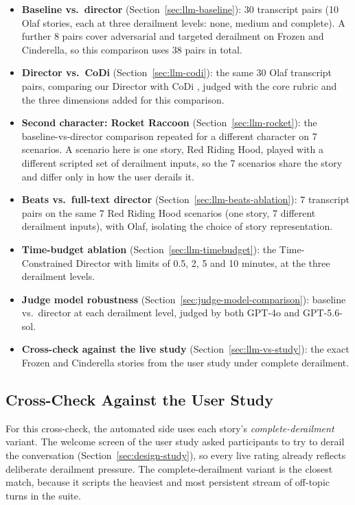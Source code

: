 \begin{itemize}
\item \textbf{Baseline vs.\ director} (Section~\ref{sec:llm-baseline}): 30 transcript pairs (10 Olaf stories, each at three derailment levels: none, medium and complete). A further 8 pairs cover adversarial and targeted derailment on Frozen and Cinderella, so this comparison uses 38 pairs in total.
\item \textbf{Director vs.\ CoDi} (Section~\ref{sec:llm-codi}): the same 30 Olaf transcript pairs, comparing our Director with CoDi \cite{kim2025codi}, judged with the core rubric and the three dimensions added for this comparison.
\item \textbf{Second character: Rocket Raccoon} (Section~\ref{sec:llm-rocket}): the baseline-vs-director comparison repeated for a different character on 7 scenarios. A scenario here is one story, Red Riding Hood, played with a different scripted set of derailment inputs, so the 7 scenarios share the story and differ only in how the user derails it.
\item \textbf{Beats vs.\ full-text director} (Section~\ref{sec:llm-beats-ablation}): 7 transcript pairs on the same 7 Red Riding Hood scenarios (one story, 7 different derailment inputs), with Olaf, isolating the choice of story representation.
\item \textbf{Time-budget ablation} (Section~\ref{sec:llm-timebudget}): the Time-Constrained Director with limits of 0.5, 2, 5 and 10 minutes, at the three derailment levels.
\item \textbf{Judge model robustness} (Section~\ref{sec:judge-model-comparison}): baseline vs.\ director at each derailment level, judged by both GPT-4o and GPT-5.6-sol.
\item \textbf{Cross-check against the live study} (Section~\ref{sec:llm-vs-study}): the exact Frozen and Cinderella stories from the user study under complete derailment.
\end{itemize}

\subsection{Cross-Check Against the User Study}\label{sec:design-crosscheck}

For this cross-check, the automated side uses each story's \emph{complete-derailment} variant. The welcome screen of the user study asked participants to try to derail the conversation (Section~\ref{sec:design-study}), so every live rating already reflects deliberate derailment pressure. The complete-derailment variant is the closest match, because it scripts the heaviest and most persistent stream of off-topic turns in the suite.

